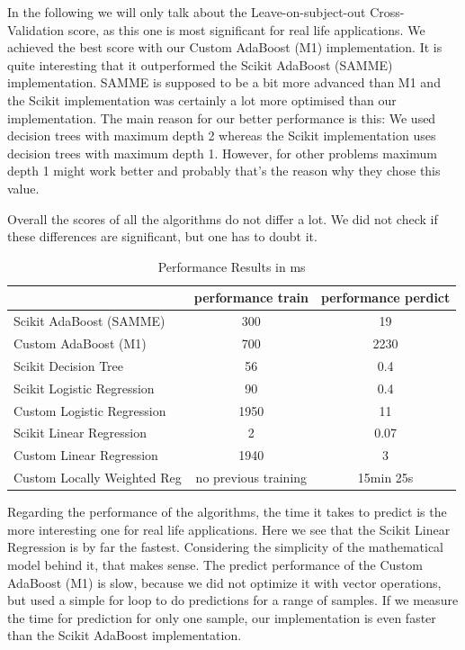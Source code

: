 \documentclass[12pt, a4paper, onecolumn, oneside, parskip=half]{scrartcl}
\begin{document}
In the following we will only talk about the Leave-on-subject-out Cross-Validation score, as this one is most significant for real life applications.
\newline We achieved the best score with our Custom AdaBoost (M1) implementation. It is quite interesting that it outperformed the Scikit AdaBoost (SAMME) implementation. SAMME is supposed to be a bit more advanced than M1 and the Scikit implementation was certainly a lot more optimised than our implementation. The main reason for our better performance is this: We used decision trees with maximum depth 2 whereas the Scikit implementation uses decision trees with maximum depth 1. However, for other problems maximum depth 1 might work better and probably that's the reason why they chose this value.

Overall the scores of all the algorithms do not differ a lot. We did not check if these differences are significant, but one has to doubt it.

\begin{table}
  \begin{tabular}{ l | c | c }
     & performance train & performance perdict \\ \hline
    Scikit AdaBoost (SAMME) & 300 & 19 \\ \hline
    Custom AdaBoost (M1) & 700 & 2230 \\ \hline
    Scikit Decision Tree & 56 & 0.4 \\ \hline
    Scikit Logistic Regression & 90 & 0.4 \\ \hline
    Custom Logistic Regression & 1950 & 11 \\ \hline
    Scikit Linear Regression & 2 & 0.07 \\ \hline
    Custom Linear Regression & 1940 & 3 \\ \hline
    Custom Locally Weighted Reg & no previous training & 15min 25s \\ \hline
  \end{tabular}
  \caption{Performance Results in ms \label{results-table-performance}}
\end{table}

Regarding the performance of the algorithms, the time it takes to predict is the more interesting one for real life applications. Here we see that the Scikit Linear Regression is  by far the fastest. Considering the simplicity of the mathematical model behind it, that makes sense. The predict performance of the Custom AdaBoost (M1) is slow, because we did not optimize it with vector operations, but used a simple for loop to do predictions for a range of samples. If we measure the time for prediction for only one sample, our implementation is even faster than the Scikit AdaBoost implementation.
\end{document}
